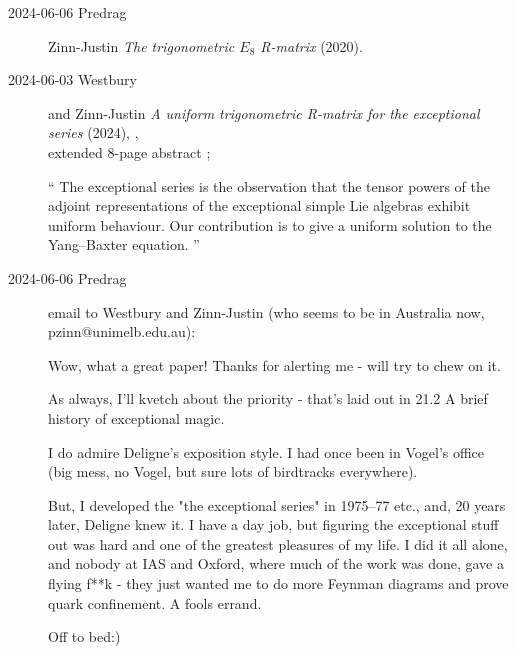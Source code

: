 \begin{description}
\item[2024-06-06 Predrag]
Zinn-Justin
{\em The trigonometric {$E_8$} {R}-matrix} (2020).

\item[2024-06-03 Westbury] and Zinn-Justin %
{\em A uniform trigonometric R-matrix for the exceptional series} (2024),
,\\ 
extended 8-page abstract ;

``
The exceptional series is the observation that the tensor powers of the
adjoint representations of the exceptional simple Lie algebras exhibit uniform behaviour.
Our contribution is to give a uniform solution to the Yang–Baxter equation.
''

\item[2024-06-06 Predrag] email to  Westbury and Zinn-Justin (who
seems to be in Australia now, pzinn@unimelb.edu.au):

Wow, what a great paper! Thanks for alerting me - will try to chew on it.

As always, I'll kvetch about the priority - that's laid out in
{21.2 A brief history of exceptional magic}.

I do admire Deligne's exposition style. I had once been in Vogel's office
(big mess, no Vogel, but sure lots of birdtracks everywhere).

But, I developed the "the exceptional series" in 1975–77 etc., and, 20
years later,  Deligne
 {knew it}.
I have a day job, but figuring the exceptional stuff out was hard and
one of the greatest pleasures of my life. I did it all alone, and nobody
at IAS and Oxford, where much of the work was done, gave a flying f**k -
they just wanted me to do more Feynman diagrams and prove quark
confinement. A fools errand.

Off to bed:)







\end{description}
\renewcommand{\ssp}{a}


\printbibliography[heading=subbibintoc,title={References}]
